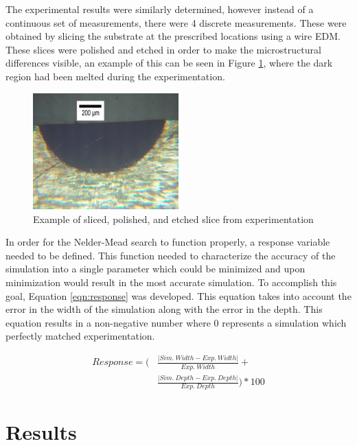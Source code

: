\documentclass[pdflatex,sn-mathphys]{sn-jnl}
\begin{document}
	The experimental results were similarly determined, however instead of a continuous set of measurements, there were 4 discrete measurements.  These were obtained by slicing the substrate at the prescribed locations using a wire \ac{EDM}.  These slices were polished and etched in order to make the microstructural differences visible, an example of this can be seen in Figure \ref{fig:7075_7_8C}, where the dark region had been melted during the experimentation.
	\begin{figure}[!htb]
		\centering
		\includegraphics[width=0.5\textwidth]{7075_7_8C}
		\caption{Example of sliced, polished, and etched slice from experimentation}
		\label{fig:7075_7_8C}
	\end{figure}
	
	In order for the Nelder-Mead search to function properly, a response variable needed to be defined.  This function needed to characterize the accuracy of the simulation into a single parameter which could be minimized and upon minimization would result in the most accurate simulation.  To accomplish this goal, Equation \ref{eqn:response} was developed.  This equation takes into account the error in the width of the simulation along with the error in the depth.  This equation results in a non-negative number where 0 represents a simulation which perfectly matched experimentation.
	
	\begin{equation}\label{eqn:response}
		\begin{split}
			Response =  \Biggl ( &\frac{\lvert Sim.\ Width - Exp.\ Width \rvert}{Exp.\ Width} + \\ 
			&\frac{\lvert Sim.\ Depth - Exp.\ Depth \rvert}{Exp.\ Depth} \Biggr ) * 100
		\end{split}
	\end{equation}

\section{Results}
\end{document}
